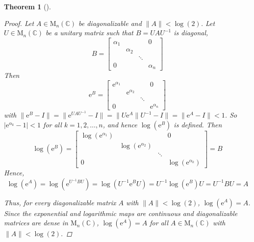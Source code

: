 \documentclass[letterpaper, 10pt]{article}
\theoremstyle{theostyle}
\newtheorem{theorem}{Theorem}[section]
\newenvironment{thmstyle}[1][]{%
    \begin{theorem}[#1]\leavevmode\vspace{-\baselineskip}\myquote%
    }{\endmyquote\end{theorem}}
\begin{document}
\begin{thmstyle}
\begin{proof}
        Let \(A \in \mathrm{M}_n(\mathbb{C})\) be diagonalizable and \(\lVert A \rVert < \log{(2)}\).
        Let \(U \in \mathrm{M}_n(\mathbb{C})\) be a unitary matrix such that \(B = UAU^{-1}\) is diagonal,
        \[B = 
        \begin{bmatrix}
            \alpha_1 & & & 0 \\
            & \alpha_2 & & \\
            & & \ddots & \\
            0 & & & \alpha_n
        \end{bmatrix}
        \]
        Then
        \[\mathrm{e}^{B} = 
        \begin{bmatrix}
            \mathrm{e}^{\alpha_1} & & & 0 \\
            & \mathrm{e}^{\alpha_2} & & \\
            & & \ddots & \\
            0 & & & \mathrm{e}^{\alpha_n}
        \end{bmatrix}\]
        with \(\lVert \mathrm{e}^B - I \rVert = \lVert \mathrm{e}^{UAU^{-1}} - I \rVert = \lVert U \mathrm{e}^A \rVert U^{-1} - I \rVert = \lVert \mathrm{e}^A - I \rVert < 1\).
        So \(\lvert \mathrm{e}^{\alpha_k} - 1 \rvert < 1\) for all \(k = 1, 2, \dots, n\), and hence \(\log{\left(\mathrm{e}^B\right)}\) is defined.
        Then
        \[\log{\left(\mathrm{e}^B\right)} = 
        \begin{bmatrix}
            \log{\left(\mathrm{e}^{\alpha_1}\right)} & & & 0 \\
            & \log{\left(\mathrm{e}^{\alpha_2}\right)} & & \\
            & & \ddots & \\
            0 & & & \log{\left(\mathrm{e}^{\alpha_k}\right)}
        \end{bmatrix}
        = B\]
        Hence,
        \[\log{\left(\mathrm{e}^A \right)} = \log{\left(\mathrm{e}^{U^{-1}BU} \right)}= \log{\left(U^{-1}\mathrm{e}^B U\right)} = U^{-1}\log{\left(\mathrm{e}^B \right)}U = U^{-1}BU = A \]

        Thus, for every diagonalizable matrix \(A\) with \(\lVert A \rVert < \log{(2)}\), \(\log{\left(\mathrm{e}^A\right)} = A\).
        Since the exponential and logarithmic maps are continuous and diagonalizable matrices are dense in \(\mathrm{M}_n(\mathbb{C})\), 
        \(\log{\left(\mathrm{e}^A\right)} = A\) for all \(A \in \mathrm{M}_n (\mathbb{C})\) with \(\lVert A \rVert < \log{(2)}\).
    \end{proof}
\end{thmstyle}
\end{document}

